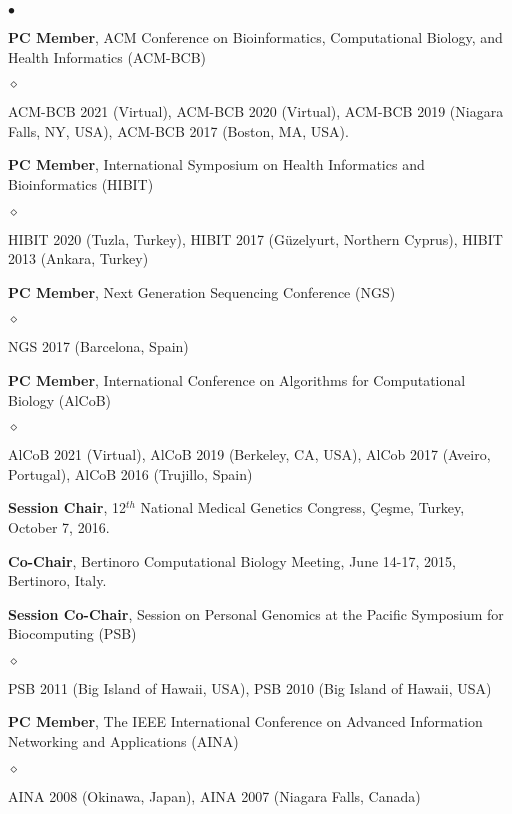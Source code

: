 \documentclass[margin,line]{res}
\newenvironment{list2}{
  \begin{list}{$\bullet$}{%
      \setlength{\itemsep}{0.1cm}
      \setlength{\parsep}{0in} \setlength{\parskip}{0in}
      \setlength{\topsep}{0in} \setlength{\partopsep}{0in} 
      \setlength{\leftmargin}{0.2in}}}{\end{list}}
\newenvironment{list3}{
  \begin{list}{$\diamond$}{%
      \setlength{\itemsep}{0in}
      \setlength{\parsep}{0.1cm} \setlength{\parskip}{0.1cm}
      \setlength{\topsep}{0.1cm} \setlength{\partopsep}{0.1cm} 
      \setlength{\leftmargin}{0.2in}}}{\end{list}}
\begin{document}
\begin{resume}
\begin{list2}
\item
  \textbf{PC Member},  ACM Conference on Bioinformatics, Computational Biology, and Health Informatics
  (ACM-BCB)
  \begin{list3}
    \item ACM-BCB 2021 (Virtual), ACM-BCB 2020 (Virtual), ACM-BCB 2019 (Niagara Falls, NY, USA), ACM-BCB 2017 (Boston, MA, USA).
  \end{list3}

\item
  \textbf{PC Member},  International Symposium on Health Informatics and Bioinformatics
  (HIBIT)
  \begin{list3}
  \item HIBIT 2020 (Tuzla, Turkey), HIBIT 2017 (Güzelyurt, Northern Cyprus), HIBIT 2013 (Ankara, Turkey)
  \end{list3}

\item
  \textbf{PC Member},  Next Generation Sequencing Conference (NGS)
  \begin{list3}
  \item NGS 2017 (Barcelona, Spain)
  \end{list3}


\item
  \textbf{PC Member}, International Conference on Algorithms for Computational Biology (AlCoB)
  \begin{list3}
   \item AlCoB 2021 (Virtual), AlCoB 2019 (Berkeley, CA, USA), AlCob 2017 (Aveiro, Portugal), AlCoB 2016 (Trujillo, Spain)
  \end{list3}
  
\item
  \textbf{Session Chair}, 12$^{th}$ National Medical Genetics Congress, Çeşme, Turkey, October 7, 2016.

\item
  \textbf{Co-Chair}, Bertinoro Computational Biology Meeting, June 14-17, 2015, Bertinoro, Italy.



\item 
  \textbf{Session Co-Chair}, Session on Personal Genomics at the Pacific Symposium for Biocomputing (PSB)
    \begin{list3}
    \item PSB 2011 (Big Island of Hawaii, USA), PSB 2010 (Big Island of Hawaii, USA)
    \end{list3}


\item
  \textbf{PC Member}, The IEEE International Conference on
  Advanced Information Networking and Applications (AINA)
  \begin{list3}
  \item AINA 2008 (Okinawa, Japan), AINA 2007 (Niagara Falls, Canada)
  \end{list3}


\end{list2}
\end{resume}
\end{document}
